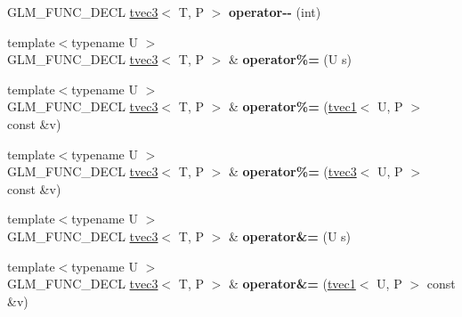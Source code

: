 \begin{DoxyCompactItemize}
\item 
\hypertarget{structglm_1_1tvec3_abc0a890711331ebd0769c133824572bc}{G\-L\-M\-\_\-\-F\-U\-N\-C\-\_\-\-D\-E\-C\-L \hyperlink{structglm_1_1tvec3}{tvec3}$<$ T, P $>$ {\bfseries operator-\/-\/} (int)}\label{structglm_1_1tvec3_abc0a890711331ebd0769c133824572bc}

\item 
\hypertarget{structglm_1_1tvec3_a4aa5ab58da32eaeded4b0e438d758ad0}{{\footnotesize template$<$typename U $>$ }\\G\-L\-M\-\_\-\-F\-U\-N\-C\-\_\-\-D\-E\-C\-L \hyperlink{structglm_1_1tvec3}{tvec3}$<$ T, P $>$ \& {\bfseries operator\%=} (U s)}\label{structglm_1_1tvec3_a4aa5ab58da32eaeded4b0e438d758ad0}

\item 
\hypertarget{structglm_1_1tvec3_a4bad68930d445ca78624dee131d95e15}{{\footnotesize template$<$typename U $>$ }\\G\-L\-M\-\_\-\-F\-U\-N\-C\-\_\-\-D\-E\-C\-L \hyperlink{structglm_1_1tvec3}{tvec3}$<$ T, P $>$ \& {\bfseries operator\%=} (\hyperlink{structglm_1_1tvec1}{tvec1}$<$ U, P $>$ const \&v)}\label{structglm_1_1tvec3_a4bad68930d445ca78624dee131d95e15}

\item 
\hypertarget{structglm_1_1tvec3_abb9bf8c109aa14bc40356f31eba946b0}{{\footnotesize template$<$typename U $>$ }\\G\-L\-M\-\_\-\-F\-U\-N\-C\-\_\-\-D\-E\-C\-L \hyperlink{structglm_1_1tvec3}{tvec3}$<$ T, P $>$ \& {\bfseries operator\%=} (\hyperlink{structglm_1_1tvec3}{tvec3}$<$ U, P $>$ const \&v)}\label{structglm_1_1tvec3_abb9bf8c109aa14bc40356f31eba946b0}

\item 
\hypertarget{structglm_1_1tvec3_af9c1c2159ca211c135ba93a0efc82379}{{\footnotesize template$<$typename U $>$ }\\G\-L\-M\-\_\-\-F\-U\-N\-C\-\_\-\-D\-E\-C\-L \hyperlink{structglm_1_1tvec3}{tvec3}$<$ T, P $>$ \& {\bfseries operator\&=} (U s)}\label{structglm_1_1tvec3_af9c1c2159ca211c135ba93a0efc82379}

\item 
\hypertarget{structglm_1_1tvec3_ad5a0fe7dd37fff314dd01d79887f02be}{{\footnotesize template$<$typename U $>$ }\\G\-L\-M\-\_\-\-F\-U\-N\-C\-\_\-\-D\-E\-C\-L \hyperlink{structglm_1_1tvec3}{tvec3}$<$ T, P $>$ \& {\bfseries operator\&=} (\hyperlink{structglm_1_1tvec1}{tvec1}$<$ U, P $>$ const \&v)}\label{structglm_1_1tvec3_ad5a0fe7dd37fff314dd01d79887f02be}


\end{DoxyCompactItemize}
